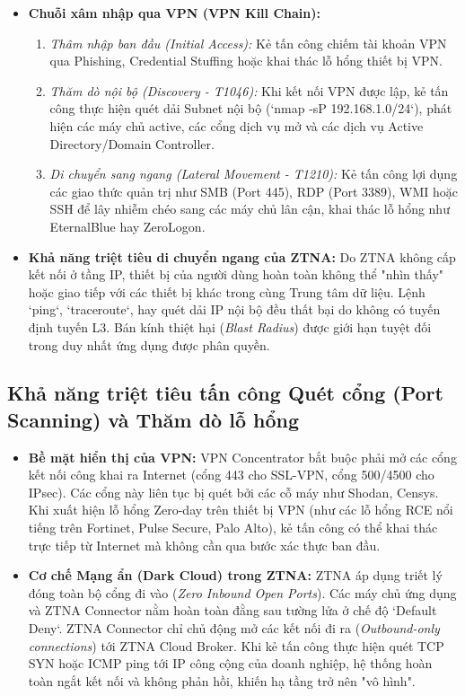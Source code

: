 \begin{itemize}
    \item \textbf{Chuỗi xâm nhập qua VPN (VPN Kill Chain):}
    \begin{enumerate}
        \item \textit{Thâm nhập ban đầu (Initial Access):} Kẻ tấn công chiếm tài khoản VPN qua Phishing, Credential Stuffing hoặc khai thác lỗ hổng thiết bị VPN.
        \item \textit{Thăm dò nội bộ (Discovery - T1046):} Khi kết nối VPN được lập, kẻ tấn công thực hiện quét dải Subnet nội bộ (`nmap -sP 192.168.1.0/24`), phát hiện các máy chủ active, các cổng dịch vụ mở và các dịch vụ Active Directory/Domain Controller.
        \item \textit{Di chuyển sang ngang (Lateral Movement - T1210):} Kẻ tấn công lợi dụng các giao thức quản trị như SMB (Port 445), RDP (Port 3389), WMI hoặc SSH để lây nhiễm chéo sang các máy chủ lân cận, khai thác lỗ hổng như EternalBlue hay ZeroLogon.
    \end{enumerate}
    
    \item \textbf{Khả năng triệt tiêu di chuyển ngang của ZTNA:} Do ZTNA không cấp kết nối ở tầng IP, thiết bị của người dùng hoàn toàn không thể "nhìn thấy" hoặc giao tiếp với các thiết bị khác trong cùng Trung tâm dữ liệu. Lệnh `ping`, `traceroute`, hay quét dải IP nội bộ đều thất bại do không có tuyến định tuyến L3. Bán kính thiệt hại (\textit{Blast Radius}) được giới hạn tuyệt đối trong duy nhất ứng dụng được phân quyền.
\end{itemize}

\subsection{Khả năng triệt tiêu tấn công Quét cổng (Port Scanning) và Thăm dò lỗ hổng}
\label{subsec:4_2_2}

\begin{itemize}
    \item \textbf{Bề mặt hiển thị của VPN:} VPN Concentrator bắt buộc phải mở các cổng kết nối công khai ra Internet (cổng 443 cho SSL-VPN, cổng 500/4500 cho IPsec). Các cổng này liên tục bị quét bởi các cỗ máy như Shodan, Censys. Khi xuất hiện lỗ hổng Zero-day trên thiết bị VPN (như các lỗ hổng RCE nổi tiếng trên Fortinet, Pulse Secure, Palo Alto), kẻ tấn công có thể khai thác trực tiếp từ Internet mà không cần qua bước xác thực ban đầu.
    \item \textbf{Cơ chế Mạng ẩn (Dark Cloud) trong ZTNA:} ZTNA áp dụng triết lý đóng toàn bộ cổng đi vào (\textit{Zero Inbound Open Ports}). Các máy chủ ứng dụng và ZTNA Connector nằm hoàn toàn đằng sau tường lửa ở chế độ `Default Deny`. ZTNA Connector chỉ chủ động mở các kết nối đi ra (\textit{Outbound-only connections}) tới ZTNA Cloud Broker. Khi kẻ tấn công thực hiện quét TCP SYN hoặc ICMP ping tới IP công cộng của doanh nghiệp, hệ thống hoàn toàn ngắt kết nối và không phản hồi, khiến hạ tầng trở nên "vô hình".
\end{itemize}

